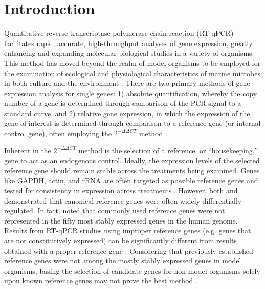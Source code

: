 \section{Introduction}
Quantitative reverse transcriptase polymerase chain reaction (RT-qPCR) facilitates rapid, accurate, high-throughput analyses of gene expression, greatly enhancing and expanding molecular biological studies in a variety of organisms. This method has moved beyond the realm of model organisms \citep{Adib2004,Antonov2005, Caldwell2005, Marionneau2005, Flatt2008} to be employed for the examination of ecological and physiological characteristics of marine microbes in both culture and the environment \citep{Zehr2001, Nicot2005, Maldonado2006, Mock2008, Zhao2009, Whitney2011a, Wurch2011, Allen2008, Kustka2007, Lin2009}. There are two primary methods of gene expression analysis for single genes: 1) absolute quantification, whereby the copy number of a gene is determined through comparison of the PCR signal to a standard curve, and 2) relative gene expression, in which the expression of the gene of interest is determined through comparison to a reference gene (or internal control gene), often employing the  $2^{- \Delta \Delta CT}$ method \citep{Livak2001, Pfaffl2001, Schmittgen2008}. \par
Inherent in the $2^{- \Delta \Delta CT}$ method is the selection of a reference, or ``housekeeping,'' gene to act as an endogenous control. Ideally, the expression levels of the selected reference gene should remain stable across the treatments being examined. Genes like GAPDH, actin, and rRNA are often targeted as possible reference genes and tested for consistency in expression across treatments \citep{Vandesompele2002, Pfaffl2004, Radonic2004}. However, both \citet{Czechowski2005} and \citet{DeJonge2007a} demonstrated that canonical reference genes were often widely differentially regulated. In fact, \citet{DeJonge2007a} noted that commonly used reference genes were not represented in the fifty most stably expressed genes in the human genome. Results from RT-qPCR studies using improper reference genes (e.g. genes that are not constitutively expressed) can be significantly different from results obtained with a proper reference gene \citep{Dheda2005, Lanoix2012a}. Considering that previously established reference genes were not among the mostly stably expressed genes in model organisms, basing the selection of candidate genes for non-model organisms solely upon known reference genes may not prove the best method \citep{DeJonge2007a, Czechowski2005}. \par
